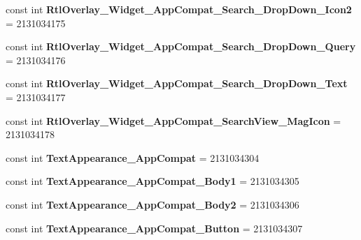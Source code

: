 \begin{DoxyCompactItemize}
\item 
\hypertarget{classClient_1_1Droid_1_1Resource_1_1Style_a49026c5a16c837b077f9a82d2c7cab15}{}const int {\bfseries Rtl\+Overlay\+\_\+\+Widget\+\_\+\+App\+Compat\+\_\+\+Search\+\_\+\+Drop\+Down\+\_\+\+Icon2} = 2131034175\label{classClient_1_1Droid_1_1Resource_1_1Style_a49026c5a16c837b077f9a82d2c7cab15}

\item 
\hypertarget{classClient_1_1Droid_1_1Resource_1_1Style_afb2bbc4c0e7700752343a0092fdf9a86}{}const int {\bfseries Rtl\+Overlay\+\_\+\+Widget\+\_\+\+App\+Compat\+\_\+\+Search\+\_\+\+Drop\+Down\+\_\+\+Query} = 2131034176\label{classClient_1_1Droid_1_1Resource_1_1Style_afb2bbc4c0e7700752343a0092fdf9a86}

\item 
\hypertarget{classClient_1_1Droid_1_1Resource_1_1Style_a1b6823a7480b9bbb2f277f46a933413a}{}const int {\bfseries Rtl\+Overlay\+\_\+\+Widget\+\_\+\+App\+Compat\+\_\+\+Search\+\_\+\+Drop\+Down\+\_\+\+Text} = 2131034177\label{classClient_1_1Droid_1_1Resource_1_1Style_a1b6823a7480b9bbb2f277f46a933413a}

\item 
\hypertarget{classClient_1_1Droid_1_1Resource_1_1Style_a34cc80c9c66609b717c82b0ac5f9ffc0}{}const int {\bfseries Rtl\+Overlay\+\_\+\+Widget\+\_\+\+App\+Compat\+\_\+\+Search\+View\+\_\+\+Mag\+Icon} = 2131034178\label{classClient_1_1Droid_1_1Resource_1_1Style_a34cc80c9c66609b717c82b0ac5f9ffc0}

\item 
\hypertarget{classClient_1_1Droid_1_1Resource_1_1Style_a36ded8d2c5abd442e26bf44c8f66094f}{}const int {\bfseries Text\+Appearance\+\_\+\+App\+Compat} = 2131034304\label{classClient_1_1Droid_1_1Resource_1_1Style_a36ded8d2c5abd442e26bf44c8f66094f}

\item 
\hypertarget{classClient_1_1Droid_1_1Resource_1_1Style_a5324e23b26c2d6bfcd51fc1f8f23e333}{}const int {\bfseries Text\+Appearance\+\_\+\+App\+Compat\+\_\+\+Body1} = 2131034305\label{classClient_1_1Droid_1_1Resource_1_1Style_a5324e23b26c2d6bfcd51fc1f8f23e333}

\item 
\hypertarget{classClient_1_1Droid_1_1Resource_1_1Style_a8cc8f47ca774b8af5e9ced73ba803689}{}const int {\bfseries Text\+Appearance\+\_\+\+App\+Compat\+\_\+\+Body2} = 2131034306\label{classClient_1_1Droid_1_1Resource_1_1Style_a8cc8f47ca774b8af5e9ced73ba803689}

\item 
\hypertarget{classClient_1_1Droid_1_1Resource_1_1Style_a32b0118e2ebb5be16fd04963ca65dc7a}{}const int {\bfseries Text\+Appearance\+\_\+\+App\+Compat\+\_\+\+Button} = 2131034307\label{classClient_1_1Droid_1_1Resource_1_1Style_a32b0118e2ebb5be16fd04963ca65dc7a}


\end{DoxyCompactItemize}
